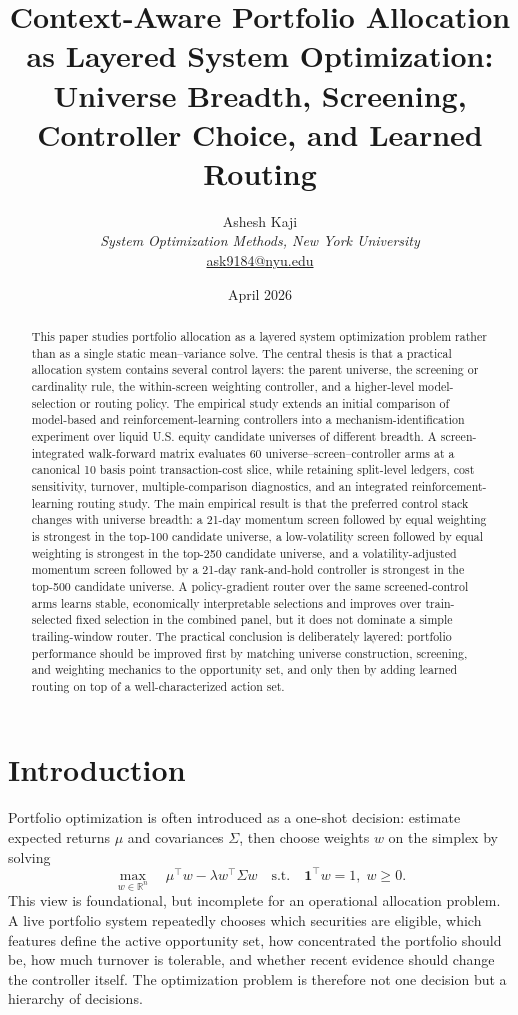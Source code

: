 \documentclass[11pt,a4paper]{article}
\title{\textbf{Context-Aware Portfolio Allocation as Layered System Optimization:}\\ Universe Breadth, Screening, Controller Choice, and Learned Routing}
\author{Ashesh Kaji\\ \textit{System Optimization Methods, New York University}\\ \href{mailto:ask9184@nyu.edu}{ask9184@nyu.edu}}
\date{April 2026}
\newcommand{\R}{\mathbb{R}}
\newcommand{\one}{\mathbf{1}}
\begin{document}
\maketitle

\begin{abstract}
This paper studies portfolio allocation as a layered system optimization problem rather than as a single static mean--variance solve. The central thesis is that a practical allocation system contains several control layers: the parent universe, the screening or cardinality rule, the within-screen weighting controller, and a higher-level model-selection or routing policy. The empirical study extends an initial comparison of model-based and reinforcement-learning controllers into a mechanism-identification experiment over liquid U.S. equity candidate universes of different breadth. A screen-integrated walk-forward matrix evaluates 60 universe--screen--controller arms at a canonical 10 basis point transaction-cost slice, while retaining split-level ledgers, cost sensitivity, turnover, multiple-comparison diagnostics, and an integrated reinforcement-learning routing study. The main empirical result is that the preferred control stack changes with universe breadth: a 21-day momentum screen followed by equal weighting is strongest in the top-100 candidate universe, a low-volatility screen followed by equal weighting is strongest in the top-250 candidate universe, and a volatility-adjusted momentum screen followed by a 21-day rank-and-hold controller is strongest in the top-500 candidate universe. A policy-gradient router over the same screened-control arms learns stable, economically interpretable selections and improves over train-selected fixed selection in the combined panel, but it does not dominate a simple trailing-window router. The practical conclusion is deliberately layered: portfolio performance should be improved first by matching universe construction, screening, and weighting mechanics to the opportunity set, and only then by adding learned routing on top of a well-characterized action set.
\end{abstract}

\section{Introduction}
Portfolio optimization is often introduced as a one-shot decision: estimate expected returns $\mu$ and covariances $\Sigma$, then choose weights $w$ on the simplex by solving
\begin{equation}
\max_{w \in \R^n} \quad \mu^{\top}w - \lambda w^{\top}\Sigma w
\quad\text{s.t.}\quad \one^{\top}w=1,\; w\geq 0.
\label{eq:markowitz}
\end{equation}
This view is foundational, but incomplete for an operational allocation problem. A live portfolio system repeatedly chooses which securities are eligible, which features define the active opportunity set, how concentrated the portfolio should be, how much turnover is tolerable, and whether recent evidence should change the controller itself. The optimization problem is therefore not one decision but a hierarchy of decisions.
\end{document}
